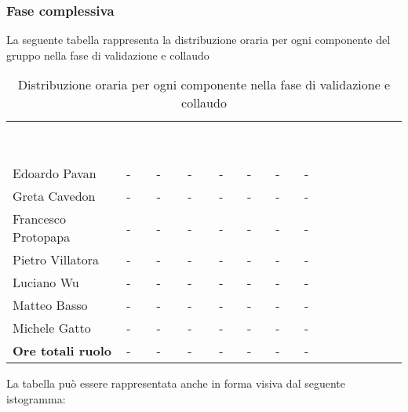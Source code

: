 \subsubsection{Fase complessiva}
La seguente tabella rappresenta la distribuzione oraria per ogni componente del gruppo nella fase di validazione e collaudo
\begin{table}[!htbp]
\begin{center}
\renewcommand{\arraystretch}{1.25}
\begin{tabular}{ m{}<{\centering}  m{}<{\centering} m{}<{\centering} m{}<{\centering}  m{}<{\centering}  m{}<{\centering}  m{}<{\centering}  m{}<{\centering}   }
	\rowcolor{darkblue}
	\textcolor{white}{\textbf{Componente}} &\textcolor{white}{\textbf{Re}}&\textcolor{white}{\textbf{Ad}}&\textcolor{white}{\textbf{An}}&\textcolor{white}{\textbf{Pt}}&\textcolor{white}{\textbf{Pr}}&\textcolor{white}{\textbf{Ve}}&\textcolor{white}{\textbf{Ore complessive}}\\ 

	Edoardo Pavan & - & - & - & - & - & - & -\\	

	\rowcolor{gray!10} Greta Cavedon & - & - & - & - & - & - & -\\
	
	Francesco Protopapa & - & - & - & - & - & - & -\\
	
	\rowcolor{gray!10} Pietro Villatora & - & - & - & - & - & - & -\\
	
	Luciano Wu & - & - & - & - & - & - & -\\
	
	\rowcolor{gray!10} Matteo Basso & - & - & - & - & - & - & -\\
	
	Michele Gatto & - & - & - & - & - & - & -\\
	
	\rowcolor{gray!10} \textbf{Ore totali ruolo} & - & - & - & - & - & - & -\\

\end{tabular}
\caption{Distribuzione oraria per ogni componente nella fase di validazione e collaudo}
\end{center}
\end{table}

La tabella può essere rappresentata anche in forma visiva dal seguente istogramma:

